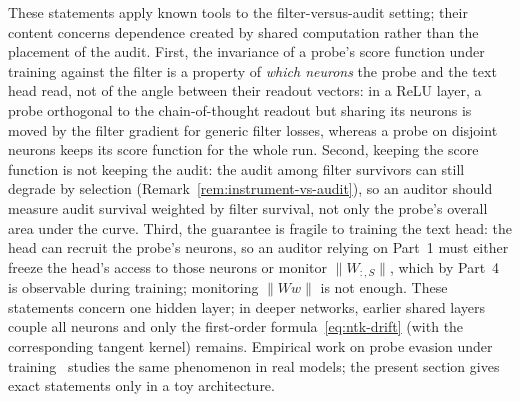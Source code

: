 \begin{remark}
These statements apply known tools to the filter-versus-audit setting; their content concerns dependence created by shared computation rather than the placement of the audit. First, the invariance of a probe's score function under training against the filter is a property of \emph{which neurons} the probe and the text head read, not of the angle between their readout vectors: in a ReLU layer, a probe orthogonal to the chain-of-thought readout but sharing its neurons is moved by the filter gradient for generic filter losses, whereas a probe on disjoint neurons keeps its score function for the whole run. Second, keeping the score function is not keeping the audit: the audit among filter survivors can still degrade by selection (Remark~\ref{rem:instrument-vs-audit}), so an auditor should measure audit survival weighted by filter survival, not only the probe's overall area under the curve. Third, the guarantee is fragile to training the text head: the head can recruit the probe's neurons, so an auditor relying on Part~1 must either freeze the head's access to those neurons or monitor $\|W_{:,S}\|$, which by Part~4 is observable during training; monitoring $\|Ww\|$ is not enough. These statements concern one hidden layer; in deeper networks, earlier shared layers couple all neurons and only the first-order formula~\eqref{eq:ntk-drift} (with the corresponding tangent kernel) remains. Empirical work on probe evasion under training~\cite{bailey2024,gupta2025} studies the same phenomenon in real models; the present section gives exact statements only in a toy architecture.
\end{remark}

